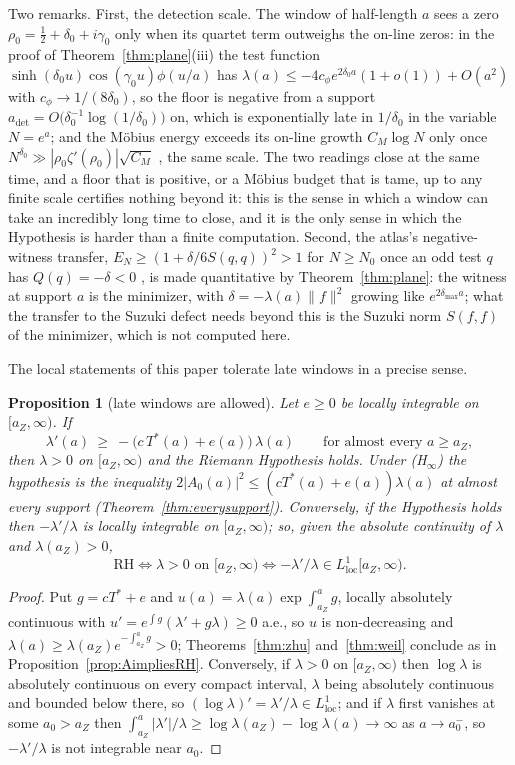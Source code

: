 \documentclass[11pt]{article}
\newtheorem{proposition}[theorem]{Proposition}
\theoremstyle{definition}
\theoremstyle{remark}
\newcommand{\Tst}{T^{*}}
\begin{document}
Two remarks. First, the detection scale. The window of half-length $a$ sees a zero $\rho_0=\tfrac12+\delta_0+i\gamma_0$ only when its quartet term outweighs the on-line zeros: in the proof of Theorem~\ref{thm:plane}(iii) the test function $\sinh(\delta_0u)\cos(\gamma_0u)\phi(u/a)$ has $\lambda(a)\le-4c_\phi e^{2\delta_0a}(1+o(1))+O(a^2)$ with $c_\phi\to1/(8\delta_0)$, so the floor is negative from a support $a_{\mathrm{det}}=O\big(\delta_0^{-1}\log(1/\delta_0)\big)$ on, which is exponentially late in $1/\delta_0$ in the variable $N=e^a$; and the M\"obius energy exceeds its on-line growth $C_M\log N$ only once $N^{\delta_0}\gg|\rho_0\zeta'(\rho_0)|\sqrt{C_M}$ \cite[Remark~15.3]{michaels-mobius}, the same scale. The two readings close at the same time, and a floor that is positive, or a M\"obius budget that is tame, up to any finite scale certifies nothing beyond it: this is the sense in which a window can take an incredibly long time to close, and it is the only sense in which the Hypothesis is harder than a finite computation. Second, the atlas's negative-witness transfer, $E_N\ge(1+\delta/6S(q,q))^2>1$ for $N\ge N_0$ once an odd test $q$ has $Q(q)=-\delta<0$ \cite[Current mathematical position]{michaels-atlas}, is made quantitative by Theorem~\ref{thm:plane}: the witness at support $a$ is the minimizer, with $\delta=-\lambda(a)\|f\|^2$ growing like $e^{2\delta_{\max}a}$; what the transfer to the Suzuki defect needs beyond this is the Suzuki norm $S(f,f)$ of the minimizer, which is not computed here.

The local statements of this paper tolerate late windows in a precise sense.

\begin{proposition}[late windows are allowed]\label{prop:late}
Let $e\ge0$ be locally integrable on $[a_Z,\infty)$. If
\[
\lambda'(a)\ \ge\ -\big(c\,\Tst(a)+e(a)\big)\,\lambda(a)\qquad\text{for almost every }a\ge a_Z ,
\]
then $\lambda>0$ on $[a_Z,\infty)$ and the Riemann Hypothesis holds. Under (H$_\infty$) the hypothesis is the inequality $2|A_0(a)|^2\le(c\Tst(a)+e(a))\lambda(a)$ at almost every support (Theorem~\ref{thm:everysupport}). Conversely, if the Hypothesis holds then $-\lambda'/\lambda$ is locally integrable on $[a_Z,\infty)$; so, given the absolute continuity of $\lambda$ and $\lambda(a_Z)>0$,
\[
\text{RH}\iff\lambda>0\text{ on }[a_Z,\infty)\iff-\lambda'/\lambda\in L^1_{\mathrm{loc}}[a_Z,\infty).
\]
\end{proposition}
\begin{proof}
Put $g=c\Tst+e$ and $u(a)=\lambda(a)\exp\int_{a_Z}^ag$, locally absolutely continuous with $u'=e^{\int g}(\lambda'+g\lambda)\ge0$ a.e., so $u$ is non-decreasing and $\lambda(a)\ge\lambda(a_Z)e^{-\int_{a_Z}^ag}>0$; Theorems~\ref{thm:zhu} and~\ref{thm:weil} conclude as in Proposition~\ref{prop:AimpliesRH}. Conversely, if $\lambda>0$ on $[a_Z,\infty)$ then $\log\lambda$ is absolutely continuous on every compact interval, $\lambda$ being absolutely continuous and bounded below there, so $(\log\lambda)'=\lambda'/\lambda\in L^1_{\mathrm{loc}}$; and if $\lambda$ first vanishes at some $a_0>a_Z$ then $\int_{a_Z}^{a}|\lambda'|/\lambda\ge\log\lambda(a_Z)-\log\lambda(a)\to\infty$ as $a\to a_0^-$, so $-\lambda'/\lambda$ is not integrable near $a_0$.
\end{proof}
\end{document}
